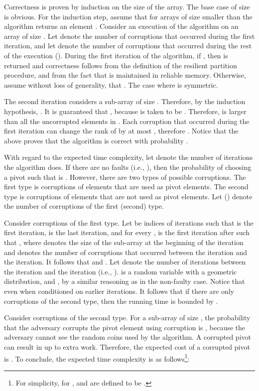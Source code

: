 \documentclass{llncs}
\begin{document}
\begin{pf}
Correctness is proven by induction on the size of the array. The base case of size  is obvious. For the induction step, assume that for arrays of size smaller than  the algorithm returns an element . Consider an execution of the algorithm on an array of size . Let  denote the number of corruptions that occurred during the first iteration, and let  denote the number of corruptions that occurred during the rest of the execution (). During the first iteration of the algorithm, if , then  is returned and correctness follows from the definition of the resilient partition procedure, and from the fact that  is maintained in reliable memory. Otherwise, assume without loss of generality, that . The case where  is symmetric.

The second iteration considers a sub-array  of size . Therefore, by the induction hypothesis, . It is guaranteed that , because  is taken to be . Therefore,  is larger than all the uncorrupted elements in . Each corruption that occurred during the first iteration can change the rank of  by at most , therefore \linebreak . Notice that the above proves that the algorithm is correct with probability .

With regard to the expected time complexity, let  denote the number of iterations the algorithm does. If there are no faults (i.e., ), then the probability of choosing a pivot  such that  is . However, there are two types of possible corruptions. The first type is corruptions of elements that are used as pivot elements. The second type is corruptions of elements that are not used as pivot elements. Let  () denote the number of corruptions of the first (second) type.

Consider corruptions of the first type. Let  be indices of iterations such that  is the first iteration,  is the last iteration, and for every ,  is the first iteration after  such that , where  denotes the size of the sub-array at the beginning of the  iteration and  denotes the number of corruptions that occurred between the  iteration and the  iteration. It follows that  and . Let  denote the number of iterations between the  iteration and the  iteration (i.e., ).  is a random variable with a geometric distribution, and , by a similar reasoning as in the non-faulty case. Notice that  even when conditioned on earlier iterations. It follows that if there are only corruptions of the second type, then the running time is bounded by .

Consider corruptions of the second type. For a sub-array of size , the probability that the adversary corrupts the pivot element using  corruption is , because the adversary cannot see the random coins used by the algorithm. A corrupted pivot can result in up to  extra work. Therefore, the expected cost of a corrupted pivot is . To conclude, the expected time complexity is as follows\footnote{For simplicity, for ,  and  are defined to be .}:




\end{pf}
\end{document}
